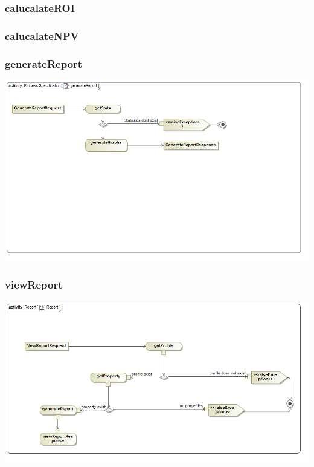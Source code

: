 \documentclass[a4paper,12pt]{article}
\begin{document}
\subsubsection{calucalateROI}
\subsubsection{calucalateNPV}

\subsubsection{generateReport}
\includegraphics[width=1\textwidth]{./Images/processSpecification/generateReport.png}
\subsubsection{viewReport}
\includegraphics[width=1\textwidth]{./Images/newDiagrams/processSpecification/Sandile/viewReport.png}
\end{document}
